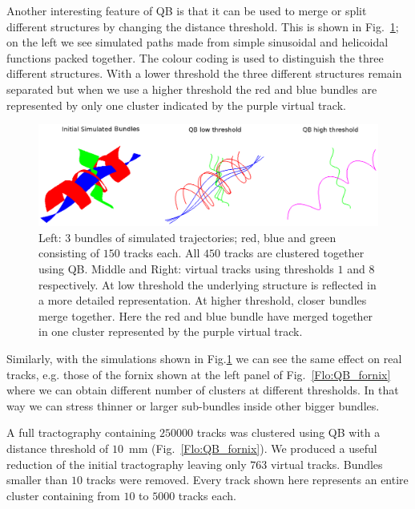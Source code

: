 \documentclass{bioinfo}
\begin{document}
Another interesting feature of QB is that it can be used to merge or
split different structures by changing the distance threshold.  This is
shown in Fig.~\ref{Flo:simulated_orbits}; on the left we see simulated
paths made from simple sinusoidal and helicoidal functions packed
together. The colour coding is used to distinguish the three different
structures. With a lower threshold the three different structures remain
separated but when we use a higher threshold the red and blue bundles
are represented by only one cluster indicated by the purple virtual
track.

\begin{figure}
\begin{centering}
\includegraphics[scale=0.5]{Figures/Fig_5_helix_phantom}
\par\end{centering}
\caption{Left: $3$ bundles of simulated trajectories; red, blue and
  green consisting of $150$ tracks each. All $450$ tracks are clustered
  together using QB. Middle and Right: virtual tracks using thresholds
  $1$ and $8$ respectively.  At low threshold the underlying structure
  is reflected in a more detailed representation. At higher threshold,
  closer bundles merge together. Here the red and blue bundle have
  merged together in one cluster represented by the purple virtual
  track.\label{Flo:simulated_orbits}}
\end{figure}

Similarly, with the simulations shown in Fig.\ref{Flo:simulated_orbits}
we can see the same effect on real tracks, e.g. those of the fornix
shown at the left panel of Fig.~\ref{Flo:QB_fornix} where we can obtain
different number of clusters at different thresholds. In that way we can
stress thinner or larger sub-bundles inside other bigger bundles. 

A full tractography containing $\num{250000}$ tracks was clustered using QB
with a distance threshold of $10$~mm (Fig.~\ref{Flo:QB_fornix}).  We
produced a useful reduction of the initial tractography leaving only
$763$ virtual tracks. Bundles smaller than $10$ tracks were
removed. Every track shown here represents an entire cluster containing
from $10$ to $\num{5000}$ tracks each.
\end{document}
